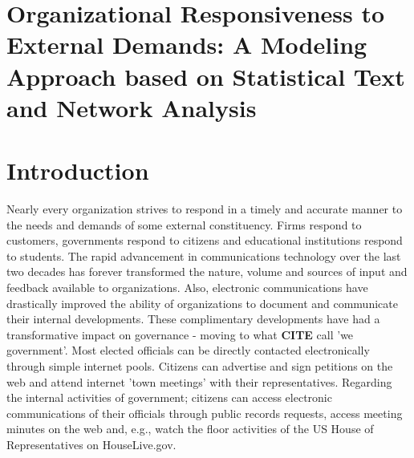 

\section*{\Large Organizational Responsiveness to External Demands:  A Modeling Approach based on Statistical Text and Network Analysis}



\section{Introduction}

Nearly every organization strives to respond in a timely and accurate manner to the needs and demands of some external constituency. Firms respond to customers, governments respond to citizens and educational institutions respond to students. The rapid advancement in communications technology over the last two decades has forever transformed the nature, volume and sources of input and feedback available to organizations. Also, electronic communications have drastically improved the ability of organizations to document and communicate their internal developments. These complimentary developments have had a transformative impact on governance - moving to what {\bf CITE} call 'we government'. Most elected officials can be directly contacted electronically through simple internet pools. Citizens can advertise and sign petitions on the web and attend internet 'town meetings' with their representatives. Regarding the internal activities of government; citizens can access electronic communications of their officials through public records requests, access meeting minutes on the web and, e.g., watch the floor activities of the US House of Representatives on HouseLive.gov. 


